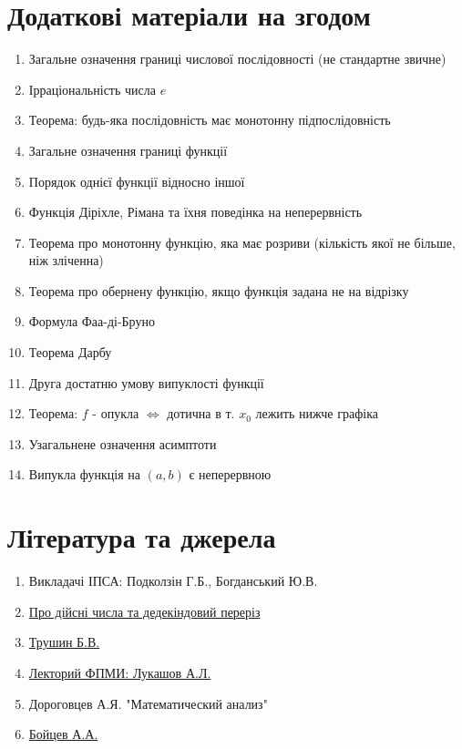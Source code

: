 \documentclass[a4paper, 14pt]{article}
\theoremstyle{theoremdd}
\theoremstyle{theoremdd}
\theoremstyle{theoremdd}
\theoremstyle{theoremdd}
\theoremstyle{theoremdd}
\theoremstyle{theoremdd}
\theoremstyle{theoremdd}
\theoremstyle{theoremdd}
\begin{document}
\section*{Додаткові матеріали на згодом}
\begin{enumerate}
\item Загальне означення границі числової послідовності (не стандартне звичне)
\item Ірраціональність числа $e$
\item Теорема: будь-яка послідовність має монотонну підпослідовність
\item Загальне означення границі функції
\item Порядок однієї функції відносно іншої
\item Функція Діріхле, Рімана та їхня поведінка на неперервність
\item Теорема про монотонну функцію, яка має розриви (кількість якої не більше, ніж зліченна)
\item Теорема про обернену функцію, якщо функція задана не на відрізку
\item Формула Фаа-ді-Бруно
\item Теорема Дарбу
\item Друга достатню умову випуклості функції
\item Теорема: $f$ - опукла $\iff$ дотична в т. $x_0$ лежить нижче графіка
\item Узагальнене означення асимптоти
\item Випукла функція на $(a,b)$ є неперервною
\end{enumerate}

\section*{Література та джерела}
\begin{enumerate}
\item Викладачі ІПСА: Подколзін Г.Б., Богданський Ю.В.
\item \href{https://www.math.brown.edu/reschwar/INF/handout3.pdf}{Про дійсні числа та дедекіндовий переріз}
\item \href{https://www.youtube.com/watch?v=6hwENpQqKP0&list=PL3BJnp-dNqazNc11qgguXNcJwCMqwK5Yv}{Трушин Б.В.}
\item \href{https://www.youtube.com/watch?v=SNq-NgYcqbY&list=PL4_hYwCyhAvZcIIZvqdQyyWx6naPeuj2W}{Лекторий ФПМИ: Лукашов А.Л.}
\item Дороговцев А.Я. "Математический анализ"
\item \href{https://www.youtube.com/watch?v=uOeZbCy6-xc&list=PLx5jwZiVE4CV0zwaZNJeL-m994o7eFbT2&index=1}{Бойцев А.А.}
\end{enumerate}
\newpage
\end{document}
